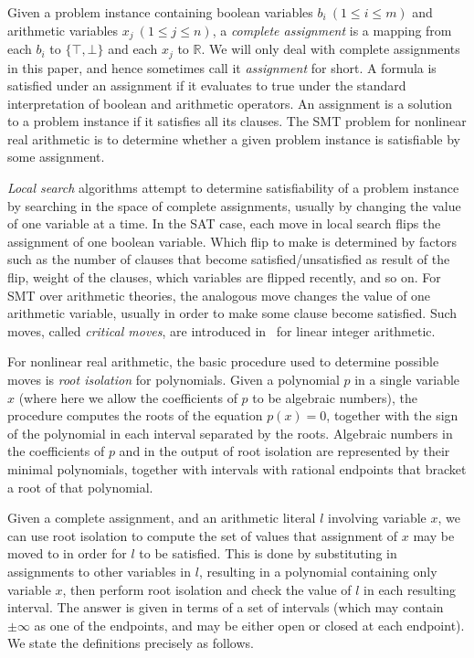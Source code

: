 \documentclass[runningheads]{llncs}
\begin{document}
Given a problem instance containing boolean variables $b_i~(1\le i\le m)$ and arithmetic variables $x_j~(1\le j\le n)$, a \emph{complete assignment} is a mapping from each $b_i$ to $\{\top, \bot\}$ and each $x_j$ to $\mathbb{R}$. We will only deal with complete assignments in this paper, and hence sometimes call it \emph{assignment} for short. A formula is satisfied under an assignment if it evaluates to true under the standard interpretation of boolean and arithmetic operators. An assignment is a solution to a problem instance if it satisfies all its clauses. The SMT problem for nonlinear real arithmetic is to determine whether a given problem instance is satisfiable by some assignment.

\emph{Local search} algorithms attempt to determine satisfiability of a problem instance by searching in the space of complete assignments, usually by changing the value of one variable at a time. In the SAT case, each move in local search flips the assignment of one boolean variable. Which flip to make is determined by factors such as the number of clauses that become satisfied/unsatisfied as result of the flip, weight of the clauses, which variables are flipped recently, and so on. For SMT over arithmetic theories, the analogous move changes the value of one arithmetic variable, usually in order to make some clause become satisfied. Such moves, called \emph{critical moves}, are introduced in~\cite{CaiLZ22} for linear integer arithmetic.

For nonlinear real arithmetic, the basic procedure used to determine possible moves is \emph{root isolation} for polynomials. Given a polynomial $p$ in a single variable $x$ (where here we allow the coefficients of $p$ to be algebraic numbers), the procedure computes the roots of the equation $p(x)=0$, together with the sign of the polynomial in each interval separated by the roots. Algebraic numbers in the coefficients of $p$ and in the output of root isolation are represented by their minimal polynomials, together with intervals with rational endpoints that bracket a root of that polynomial.

Given a complete assignment, and an arithmetic literal $l$ involving variable $x$, we can use root isolation to compute the set of values that assignment of $x$ may be moved to in order for $l$ to be satisfied. This is done by substituting in assignments to other variables in $l$, resulting in a polynomial containing only variable $x$, then perform root isolation and check the value of $l$ in each resulting interval. The answer is given in terms of a set of intervals (which may contain $\pm\infty$ as one of the endpoints, and may be either open or closed at each endpoint). We state the definitions precisely as follows.
\end{document}
